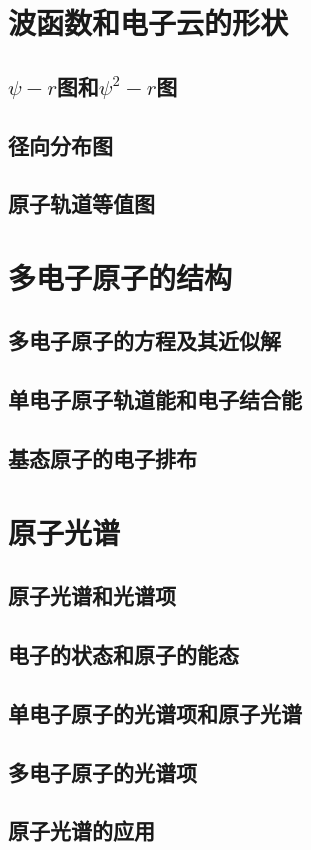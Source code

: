 \section{波函数和电子云的形状}

\subsection{$\psi-r$图和$\psi^2-r$图}

\subsection{径向分布图}

\subsection{原子轨道等值图}



\section{多电子原子的结构}

\subsection{多电子原子的\schr 方程及其近似解}

\subsection{单电子原子轨道能和电子结合能}

\subsection{基态原子的电子排布}



\section{原子光谱}

\subsection{原子光谱和光谱项}

\subsection{电子的状态和原子的能态}

\subsection{单电子原子的光谱项和原子光谱}

\subsection{多电子原子的光谱项}

\subsection{原子光谱的应用}



